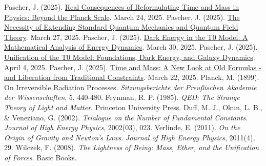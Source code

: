 \documentclass[12pt,a4paper]{article}
\begin{document}
\begin{thebibliography}{99}
		 Pascher, J. (2025). \href{https://github.com/jpascher/T0-Time-Mass-Duality/tree/main/2/pdf/English/JenseitsPlanckEn.pdf}{Real Consequences of Reformulating Time and Mass in Physics: Beyond the Planck Scale}. March 24, 2025.
		 Pascher, J. (2025). \href{https://github.com/jpascher/T0-Time-Mass-Duality/tree/main/2/pdf/English/NotwendigkeitQMErweiterungEn.pdf}{The Necessity of Extending Standard Quantum Mechanics and Quantum Field Theory}. March 27, 2025.
		 Pascher, J. (2025). \href{https://github.com/jpascher/T0-Time-Mass-Duality/tree/main/2/pdf/English/MathEnergiedynamikEn.pdf}{Dark Energy in the T0 Model: A Mathematical Analysis of Energy Dynamics}. March 30, 2025.
		 Pascher, J. (2025). \href{https://github.com/jpascher/T0-Time-Mass-Duality/tree/main/2/pdf/English/T0VereinheitlichungDEGalEn.pdf}{Unification of the T0 Model: Foundations, Dark Energy, and Galaxy Dynamics}. April 4, 2025.
		 Pascher, J. (2025). \href{https://github.com/jpascher/T0-Time-Mass-Duality/tree/main/2/pdf/English/ZeitMasseNeuerBlickEn.pdf}{Time and Mass: A New Look at Old Formulas - and Liberation from Traditional Constraints}. March 22, 2025.
		 Planck, M. (1899). On Irreversible Radiation Processes. \textit{Sitzungsberichte der Preußischen Akademie der Wissenschaften}, 5, 440-480.
		 Feynman, R. P. (1985). \textit{QED: The Strange Theory of Light and Matter}. Princeton University Press.
		 Duff, M. J., Okun, L. B., \& Veneziano, G. (2002). \textit{Trialogue on the Number of Fundamental Constants}. \textit{Journal of High Energy Physics}, 2002(03), 023.
		 Verlinde, E. (2011). \textit{On the Origin of Gravity and Newton's Laws}. \textit{Journal of High Energy Physics}, 2011(4), 29.
		 Wilczek, F. (2008). \textit{The Lightness of Being: Mass, Ether, and the Unification of Forces}. Basic Books.
	\end{thebibliography}
	
\end{document}
